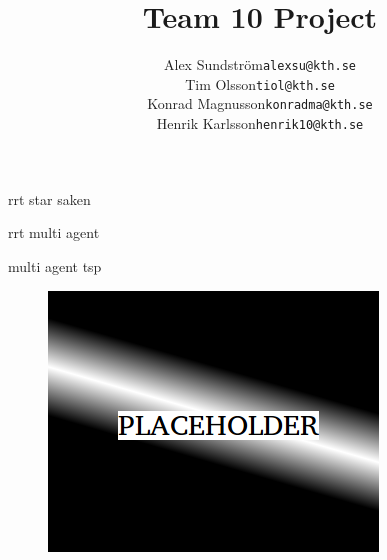 \documentclass{article}
\title{Team 10 Project}
\author{
	\begin{tabular}{rl}
		Alex Sundström&   \texttt{alexsu@kth.se}\\
		Tim Olsson&       \texttt{tiol@kth.se}\\
		Konrad Magnusson& \texttt{konradma@kth.se}\\
		Henrik Karlsson&  \texttt{henrik10@kth.se}
	\end{tabular}
	}
\begin{document}
	\maketitle
	
	rrt star saken~\cite{rrt_star_smart}
	
	rrt multi agent~\cite{multi_agent_rrt}
	
	multi agent tsp~\cite{multi_agent_tsp}
	
	\begin{figure}[h]
		\centering
		\vspace*{2cm}
		\includegraphics[scale=0.7]{img/front}
	\end{figure}
	
	
	
\printbibliography{}
\end{document}
